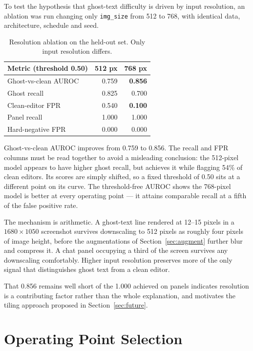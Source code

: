 \documentclass[12pt,oneside]{report}
\newcommand{\code}[1]{\texttt{\small #1}}
\begin{document}
To test the hypothesis that ghost-text difficulty is driven by input
resolution, an ablation was run changing only \code{img\_size} from 512 to 768,
with identical data, architecture, schedule and seed.

\begin{table}[h]
\centering
\caption{Resolution ablation on the held-out set. Only input resolution differs.}
\begin{tabular}{@{}lrr@{}}
\toprule
\textbf{Metric (threshold 0.50)} & \textbf{512 px} & \textbf{768 px} \\
\midrule
Ghost-vs-clean AUROC & 0.759 & \textbf{0.856} \\
Ghost recall & 0.825 & 0.700 \\
Clean-editor FPR & 0.540 & \textbf{0.100} \\
Panel recall & 1.000 & 1.000 \\
Hard-negative FPR & 0.000 & 0.000 \\
\bottomrule
\end{tabular}
\end{table}

Ghost-vs-clean AUROC improves from 0.759 to 0.856. The recall and FPR columns
must be read together to avoid a misleading conclusion: the 512-pixel model
appears to have higher ghost recall, but achieves it while flagging 54\% of
clean editors. Its scores are simply shifted, so a fixed threshold of 0.50 sits
at a different point on its curve. The threshold-free AUROC shows the
768-pixel model is better at every operating point --- it attains comparable
recall at a fifth of the false positive rate.

The mechanism is arithmetic. A ghost-text line rendered at 12--15 pixels in a
$1680\times1050$ screenshot survives downscaling to 512 pixels as roughly four
pixels of image height, before the augmentations of Section~\ref{sec:augment}
further blur and compress it. A chat panel occupying a third of the screen
survives any downscaling comfortably. Higher input resolution preserves more of
the only signal that distinguishes ghost text from a clean editor.

That 0.856 remains well short of the 1.000 achieved on panels indicates
resolution is a contributing factor rather than the whole explanation, and
motivates the tiling approach proposed in Section~\ref{sec:future}.

\section{Operating Point Selection}
\label{sec:operating}
\end{document}

